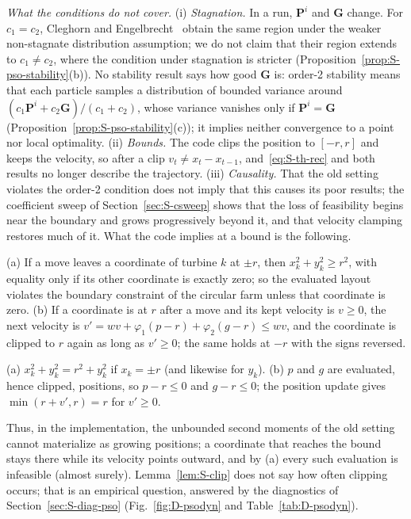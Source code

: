 \emph{What the conditions do not cover.} (i) \emph{Stagnation.} In a run, $\mathbf P^i$ and $\mathbf G$ change. For $c_1=c_2$, Cleghorn and Engelbrecht~\cite{Cleghorn2018} obtain the same region under the weaker non-stagnate distribution assumption; we do not claim that their region extends to $c_1\ne c_2$, where the condition under stagnation is stricter (Proposition~\ref{prop:S-pso-stability}(b)). No stability result says how good $\mathbf G$ is: order-2 stability means that each particle samples a distribution of bounded variance around $(c_1\mathbf P^i+c_2\mathbf G)/(c_1+c_2)$, whose variance vanishes only if $\mathbf P^i=\mathbf G$ (Proposition~\ref{prop:S-pso-stability}(c)); it implies neither convergence to a point nor local optimality. (ii) \emph{Bounds.} The code clips the position to $[-r,r]$ and keeps the velocity, so after a clip $v_t\ne x_t-x_{t-1}$, and~\eqref{eq:S-th-rec} and both results no longer describe the trajectory. (iii) \emph{Causality.} That the old setting violates the order-2 condition does not imply that this causes its poor results; the coefficient sweep of Section~\ref{sec:S-csweep} shows that the loss of feasibility begins near the boundary and grows progressively beyond it, and that velocity clamping restores much of it. What the code implies at a bound is the following.

\begin{lemS}
\label{lem:S-clip}
(a) If a move leaves a coordinate of turbine $k$ at $\pm r$, then $x_k^2+y_k^2\ge r^2$, with equality only if its other coordinate is exactly zero; so the evaluated layout violates the boundary constraint of the circular farm unless that coordinate is zero. (b) If a coordinate is at $r$ after a move and its kept velocity is $v\ge0$, the next velocity is $v'=wv+\varphi_1(p-r)+\varphi_2(g-r)\le wv$, and the coordinate is clipped to $r$ again as long as $v'\ge0$; the same holds at $-r$ with the signs reversed.
\end{lemS}
\begin{thSproof}
(a) $x_k^2+y_k^2=r^2+y_k^2$ if $x_k=\pm r$ (and likewise for $y_k$). (b) $p$ and $g$ are evaluated, hence clipped, positions, so $p-r\le0$ and $g-r\le0$; the position update gives $\min(r+v',r)=r$ for $v'\ge0$.
\end{thSproof}
Thus, in the implementation, the unbounded second moments of the old setting cannot materialize as growing positions; a coordinate that reaches the bound stays there while its velocity points outward, and by (a) every such evaluation is infeasible (almost surely). Lemma~\ref{lem:S-clip} does not say how often clipping occurs; that is an empirical question, answered by the diagnostics of Section~\ref{sec:S-diag-pso} (Fig.~\ref{fig:D-psodyn} and Table~\ref{tab:D-psodyn}).

